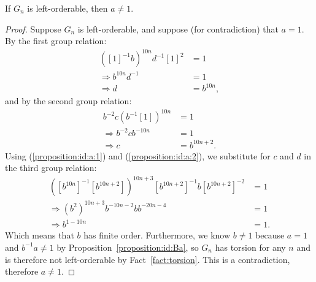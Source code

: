 \begin{proposition}
If $G_n$ is left-orderable, then $a\neq1$.
\label{proposition:id:a}
\end{proposition}
\begin{proof} Suppose $G_n$ is left-orderable, and suppose (for contradiction) that $a=1$. By the first group relation:
\begin{align}
([1]^{-1}b)^{10n}d^{-1}[1]^{2} & =1\nonumber\\
\Rightarrow b^{10n}d^{-1} & =1\nonumber\\
\Rightarrow d & =b^{10n},\label{proposition:id:a:1}
\end{align}
and by the second group relation:
\begin{align}
b^{-2}c(b^{-1}[1])^{10n} & =1\nonumber\\
\Rightarrow b^{-2}cb^{-10n} & =1\nonumber\\
\Rightarrow c & =b^{10n+2}.\label{proposition:id:a:2}
\end{align}
Using (\ref{proposition:id:a:1}) and (\ref{proposition:id:a:2}), we substitute for $c$ and $d$ in the third group relation:
\begin{align}
([b^{10n}]^{-1}[b^{10n+2}])^{10n+3}[b^{10n+2}]^{-1}b[b^{10n+2}]^{-2} & =1\nonumber\\
\Rightarrow(b^{2})^{10n+3}b^{-10n-2}bb^{-20n-4} & =1\nonumber\\
\Rightarrow b^{1-10n} & =1.\nonumber
\end{align}
Which means that $b$ has finite order. Furthermore, we know $b\neq1$
because $a=1$ and $b^{-1}a\neq1$ by Proposition~\ref{proposition:id:Ba}, so $G_{n}$ has torsion for any $n$ and is therefore not left-orderable by Fact~\ref{fact:torsion}. This is a contradiction, therefore $a\neq{}1$.
\end{proof}

